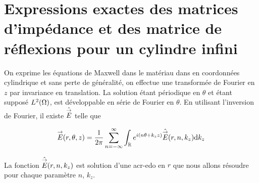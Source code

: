 \section{Expressions exactes des matrices d'impédance et des matrice de réflexions pour un cylindre infini}


  \begin{figure}[!hbt]
    \centering
    \begin{tikzpicture}
      
    \end{tikzpicture}
  \end{figure}

  On exprime les équations de Maxwell dans le matériau dans en coordonnées cylindrique et sans perte de généralité, on effectue une transformée de Fourier en \(z\) par invariance en translation. La solution étant périodique en \(\theta\) et étant supposé \(L^2(\OO)\), est développable en série de Fourier en \(\theta\). En utilisant l'inversion de Fourier, il existe \(\hat\vE\) telle que

  \begin{equation}
    \vE(r,\theta,z) = \frac{1}{2\pi}\sum_{n=-\infty}^{\infty}\int_{\RR} e^{i(n \theta + k_z z )}\hat{\vE} (r,n,k_z) \dd{k_z}
  \end{equation}

  La fonction \(\hat{\vE} (r,n,k_z)\) est solution d'une \gls{acr-edo} en \(r\) que nous allons résoudre pour chaque paramètre \(n\), \(k_z\).

